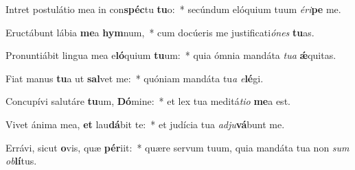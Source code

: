 \item Intret postulátio mea in con\textbf{spéc}tu \textbf{tu}o:~* secúndum elóquium tuum \textit{é}\textit{ri}\textbf{pe} me.
\item Eructábunt lábia \textbf{me}a \textbf{hym}num,~* cum docúeris me justificati\textit{ó}\textit{nes} \textbf{tu}as.
\item Pronuntiábit lingua mea e\textbf{ló}quium \textbf{tu}um:~* quia ómnia mandáta \textit{tu}\textit{a} \textbf{ǽ}quitas.
\item Fiat manus \textbf{tu}a ut \textbf{sal}vet me:~* quóniam mandáta tu\textit{a} \textit{e}\textbf{lé}gi.
\item Concupívi salutáre \textbf{tu}um, \textbf{Dó}mine:~* et lex tua meditá\textit{ti}\textit{o} \textbf{me}a est.
\item Vivet ánima mea, \textbf{et} lau\textbf{dá}bit te:~* et judícia tua \textit{ad}\textit{ju}\textbf{vá}bunt me.
\item Errávi, sicut \textbf{o}vis, quæ \textbf{pér}iit:~* quære servum tuum, quia mandáta tua non \textit{sum} \textit{ob}\textbf{lí}tus.
